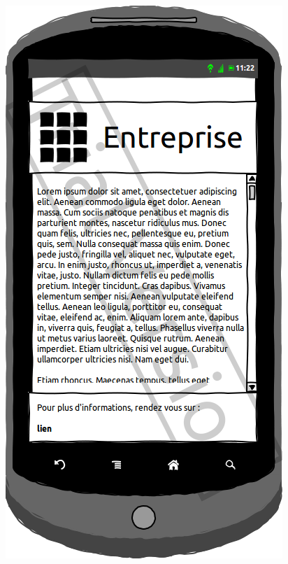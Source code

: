 \documentclass[a4paper, 11px]{article}
\begin{document}
\begin{figure}[htbp]
\begin{minipage}[c]{.50\linewidth}
\begin{center}
			\includegraphics[scale=0.3]{../../Sketch/Android/DescrBP.png}
		\end{center}
	\end{minipage}
\end{figure}
\vfill
\clearpage
\end{document}
